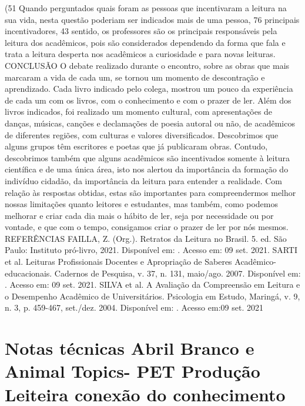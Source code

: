(51%
Quando perguntados quais foram as pessoas que incentivaram a leitura na sua vida, nesta
questão poderiam ser indicados mais de uma pessoa, 76%
principais incentivadores, 43%
sentido, os professores são os principais responsáveis pela leitura dos acadêmicos, pois são
considerados dependendo da forma que fala e trata a leitura desperta nos acadêmicos a
curiosidade e para novas leituras.
CONCLUSÃO
O debate realizado durante o encontro, sobre as obras que mais marcaram a vida de cada
um, se tornou um momento de descontração e aprendizado. Cada livro indicado pelo colega,
mostrou um pouco da experiência de cada um com os livros, com o conhecimento e com o
prazer de ler.
Além dos livros indicados, foi realizado um momento cultural, com apresentações de
danças, músicas, canções e declamações de poesia autoral ou não, de acadêmicos de diferentes
regiões, com culturas e valores diversificados. Descobrimos que alguns grupos têm escritores e
poetas que já publicaram obras. Contudo, descobrimos também que alguns acadêmicos são
incentivados somente à leitura científica e de uma única área, isto nos alertou da importância da
formação do indivíduo cidadão, da importância da leitura para entender a realidade.
Com relação às respostas obtidas, estas são importantes para compreendermos melhor
nossas limitações quanto leitores e estudantes, mas também, como podemos melhorar e criar
cada dia mais o hábito de ler, seja por necessidade ou por vontade, e que com o tempo,
consigamos criar o prazer de ler por nós mesmos.
REFERÊNCIAS
FAILLA, Z. (Org.). Retratos da Leitura no Brasil. 5. ed. São Paulo: Instituto pró-livro, 2021.
Disponível em:
. Acesso em: 09 set. 2021.
SARTI et al. Leituras Profissionais Docentes e Apropriação de Saberes
Acadêmico-educacionais. Cadernos de Pesquisa, v. 37, n. 131, maio/ago. 2007. Disponível em:
. Acesso
em: 09 set. 2021.
SILVA et al. A Avaliação da Compreensão em Leitura e o Desempenho Acadêmico de
Universitários. Psicologia em Estudo, Maringá, v. 9, n. 3, p. 459-467, set./dez. 2004. Disponível
em: .
Acesso em:09 set. 2021



\section{Notas técnicas Abril Branco  e Animal Topics- PET Produção Leiteira conexão do conhecimento}

